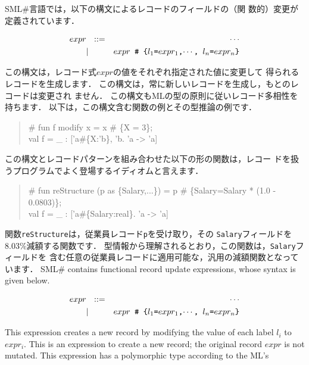 \documentclass{jbook}
\newcommand{\smlsharp}{SML\#}
\begin{document}
\ifjp%
	\smlsharp{}言語では，以下の構文によるレコードのフィールドの（関
数的）変更が定義されています．
\begin{tt}
\begin{eqnarray*}
expr &\mbox{\ \ }::=& \cdots \\
     &|& \mbox{\tt $expr$ {\#} \{$l_1$=$expr_1$,$\cdots$, $l_n$=$expr_n$\}}
\end{eqnarray*}
\end{tt}
	この構文は，レコード式$expr$の値をそれぞれ指定された値に変更して
得られるレコードを生成します．
	この構文は，常に新しいレコードを生成し，もとのレコードは変更され
ません．
	この構文もMLの型の原則に従いレコード多相性を持ちます．
	以下は，この構文含む関数の例とその型推論の例です．
\begin{tt}\begin{quote}
\# fun f modify x = x \# \{X = 3\};\\
val f = \_ : ['a\#\{X:'b\}, 'b.  'a -> 'a]
\end{quote}\end{tt}
	この構文とレコードパターンを組み合わせた以下の形の関数は，レコー
ドを扱うプログラムでよく登場するイディオムと言えます．
\begin{tt}\begin{quote}
\# fun reStructure (p as \{Salary,...\}) = p \# \{Salary=Salary * (1.0 - 0.0803)\};\\
val f = \_ : ['a\#\{Salary:real\}.  'a -> 'a]
\end{quote}\end{tt}
	関数{\tt reStructure}は，従業員レコード{\tt p}を受け取り，その
{\tt Salary}フィールドを8.03\%減額する関数です．
	型情報から理解されるとおり，この関数は，{\tt Salary}フィールドを
含む任意の従業員レコードに適用可能な，汎用の減額関数となっています．
\else%
	\smlsharp{} contains functional record update expressions, whose
syntax is given below.
\begin{tt}
\begin{eqnarray*}
expr &\mbox{\ \ }::=& \cdots \\
     &|& \mbox{\tt $expr$ {\#} \{$l_1$=$expr_1$,$\cdots$, $l_n$=$expr_n$\}}
\end{eqnarray*}
\end{tt}
	This expression creates a new record by modifying the value of
each label $l_i$ to $expr_i$.
	This is an expression to create a new record; the original
record $expr$ is not mutated.
	This expression has a polymorphic type according to the ML's
\end{document}
